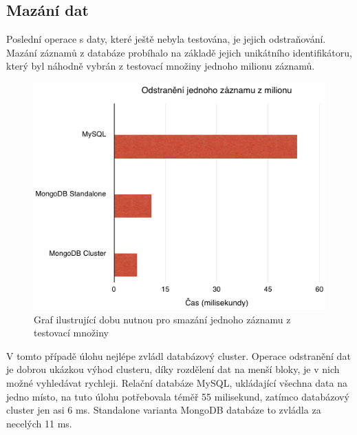 \subsection{Mazání dat}
Poslední operace s daty, které ještě nebyla testována, je jejich odstraňování. Mazání záznamů z databáze probíhalo na základě jejich unikátního identifikátoru, který byl náhodně vybrán z testovací množiny jednoho milionu záznamů.
\begin{figure}[h]
\begin{centering}
\includegraphics[scale=0.6]{obrazky/grafy/delete}
\par\end{centering}
\caption{Graf ilustrující dobu nutnou pro smazání jednoho záznamu z testovací množiny}
\end{figure}

V tomto případě úlohu nejlépe zvládl databázový cluster. Operace odstranění dat je dobrou ukázkou výhod clusteru, díky rozdělení dat na menší bloky, je v nich možné vyhledávat rychleji. Relační databáze MySQL, ukládající všechna data na jedno místo, na tuto úlohu potřebovala téměř 55 milisekund, zatímco databázový cluster jen asi 6 ms. Standalone varianta MongoDB databáze to zvládla za necelých 11 ms.


